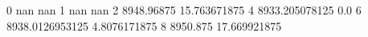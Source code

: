 0 nan nan
1 nan nan
2 8948.96875 15.763671875
4 8933.205078125 0.0
6 8938.0126953125 4.8076171875
8 8950.875 17.669921875
